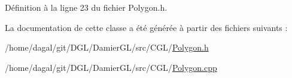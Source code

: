 Définition à la ligne 23 du fichier Polygon.\-h.



La documentation de cette classe a été générée à partir des fichiers suivants \-:\begin{DoxyCompactItemize}
\item 
/home/dagal/git/\-D\-G\-L/\-Damier\-G\-L/src/\-C\-G\-L/\hyperlink{_polygon_8h}{Polygon.\-h}\item 
/home/dagal/git/\-D\-G\-L/\-Damier\-G\-L/src/\-C\-G\-L/\hyperlink{_polygon_8cpp}{Polygon.\-cpp}\end{DoxyCompactItemize}
